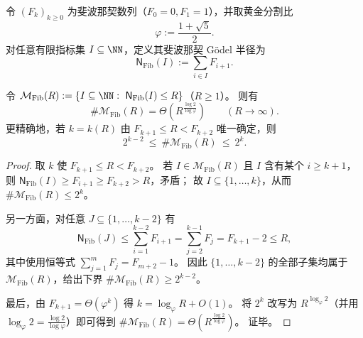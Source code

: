 \begin{definition}\label{def:fold-hypercube-fibonacci-godel-radius}
令 \((F_k)_{k\ge 0}\) 为斐波那契数列（\(F_0=0,F_1=1\)），并取黄金分割比
\[
\varphi:=\frac{1+\sqrt5}{2}.
\]
对任意有限指标集 \(I\subseteq\NN\)，定义其斐波那契 Gödel 半径为
\[
\mathsf N_{\mathrm{Fib}}(I):=\sum_{i\in I}F_{i+1}.
\]
\end{definition}

\begin{proposition}\label{prop:fold-hypercube-fibonacci-godel-radius-count}
令 \(\mathcal M_{\mathrm{Fib}}(R):=\{I\subseteq\NN:\ \mathsf N_{\mathrm{Fib}}(I)\le R\}\)（\(R\ge 1\)）。
则有
\[
\#\mathcal M_{\mathrm{Fib}}(R)=\Theta\!\left(R^{\frac{\log 2}{\log\varphi}}\right)
\qquad(R\to\infty).
\]
更精确地，若 \(k=k(R)\) 由 \(F_{k+1}\le R<F_{k+2}\) 唯一确定，则
\[
2^{k-2}\ \le\ \#\mathcal M_{\mathrm{Fib}}(R)\ \le\ 2^{k}.
\]
\end{proposition}
\begin{proof}
取 \(k\) 使 \(F_{k+1}\le R<F_{k+2}\)。
若 \(I\in\mathcal M_{\mathrm{Fib}}(R)\) 且 \(I\) 含有某个 \(i\ge k+1\)，则 \(\mathsf N_{\mathrm{Fib}}(I)\ge F_{i+1}\ge F_{k+2}>R\)，矛盾；
故 \(I\subseteq\{1,\dots,k\}\)，从而 \(\#\mathcal M_{\mathrm{Fib}}(R)\le 2^k\)。
\par
另一方面，对任意 \(J\subseteq\{1,\dots,k-2\}\) 有
\[
\mathsf N_{\mathrm{Fib}}(J)
\le
\sum_{i=1}^{k-2}F_{i+1}
=
\sum_{j=2}^{k-1}F_j
=
F_{k+1}-2
\le
R,
\]
其中使用恒等式 \(\sum_{j=1}^{m}F_j=F_{m+2}-1\)。
因此 \(\{1,\dots,k-2\}\) 的全部子集均属于 \(\mathcal M_{\mathrm{Fib}}(R)\)，给出下界 \(\#\mathcal M_{\mathrm{Fib}}(R)\ge 2^{k-2}\)。
\par
最后，由 \(F_{k+1}=\Theta(\varphi^{k})\) 得 \(k=\log_\varphi R+O(1)\)。
将 \(2^{k}\) 改写为 \(R^{\log_\varphi 2}\)（并用 \(\log_\varphi 2=\frac{\log 2}{\log\varphi}\)）即可得到 \(\#\mathcal M_{\mathrm{Fib}}(R)=\Theta\!\left(R^{\frac{\log 2}{\log\varphi}}\right)\)。
证毕。
\end{proof}

